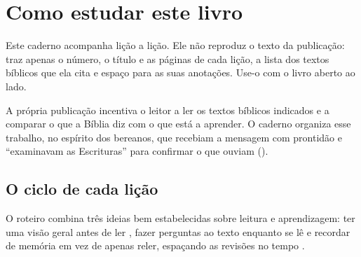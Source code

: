 \chapter{Como estudar este livro}

Este caderno acompanha \emph{\livroNome} \parencite{livro} lição a lição. Ele
não reproduz o texto da publicação: traz apenas o número, o título e as
páginas de cada lição, a lista dos textos bíblicos que ela cita e espaço para
as suas anotações. Use-o com o livro aberto ao lado.

A própria publicação incentiva o leitor a ler os textos bíblicos indicados e
a comparar o que a Bíblia diz com o que está a aprender. O caderno organiza
esse trabalho, no espírito dos bereanos, que recebiam a mensagem com
prontidão e \enquote{examinavam as Escrituras} para confirmar o que ouviam
().

\section{O ciclo de cada lição}

O roteiro combina três ideias bem estabelecidas sobre leitura e aprendizagem:
ter uma visão geral antes de ler \parencite{robinson1946}, fazer perguntas ao
texto enquanto se lê \parencite{adler1972} e recordar de memória em vez de
apenas reler, espaçando as revisões no tempo \parencite{brown2014}.

\begin{center}
\end{center}

